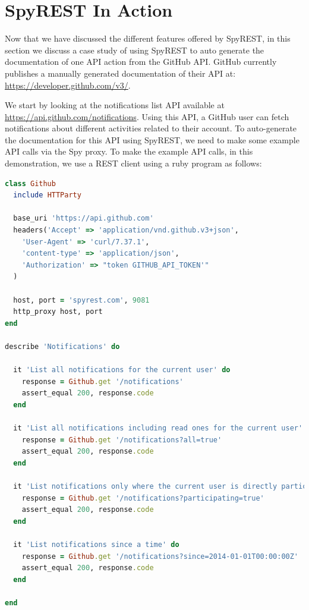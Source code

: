 \documentclass[conference]{IEEEtran}
\begin{document}
\section{SpyREST In Action}
Now that we have discussed the different features offered by SpyREST, in this section we discuss a case study of using SpyREST to auto generate the documentation of one API action from the GitHub API. GitHub currently publishes a manually generated documentation of their API at: \url{https://developer.github.com/v3/}.

We start by looking at the notifications list API available at \url{https://api.github.com/notifications}. Using this API, a GitHub user can fetch notifications about different activities related to their account. To auto-generate the documentation for this API using SpyREST, we need to make some example API calls via the Spy proxy. To make the example API calls, in this demonstration, we use a REST client using a ruby program as follows:

\lstset{showstringspaces=false, basicstyle=\footnotesize, numbers=left, numbersep=1pt }
\begin{lstlisting}[language=ruby, breaklines=true, caption={}, label=list:ex]
class Github
  include HTTParty

  base_uri 'https://api.github.com'
  headers('Accept' => 'application/vnd.github.v3+json',
    'User-Agent' => 'curl/7.37.1',
    'content-type' => 'application/json',
    'Authorization' => "token GITHUB_API_TOKEN'"
  )

  host, port = 'spyrest.com', 9081
  http_proxy host, port
end

describe 'Notifications' do

  it 'List all notifications for the current user' do
    response = Github.get '/notifications'
    assert_equal 200, response.code
  end

  it 'List all notifications including read ones for the current user' do
    response = Github.get '/notifications?all=true'
    assert_equal 200, response.code
  end

  it 'List notifications only where the current user is directly participating or mentioned' do
    response = Github.get '/notifications?participating=true'
    assert_equal 200, response.code
  end

  it 'List notifications since a time' do
    response = Github.get '/notifications?since=2014-01-01T00:00:00Z'
    assert_equal 200, response.code
  end

end\end{lstlisting}
\end{document}
